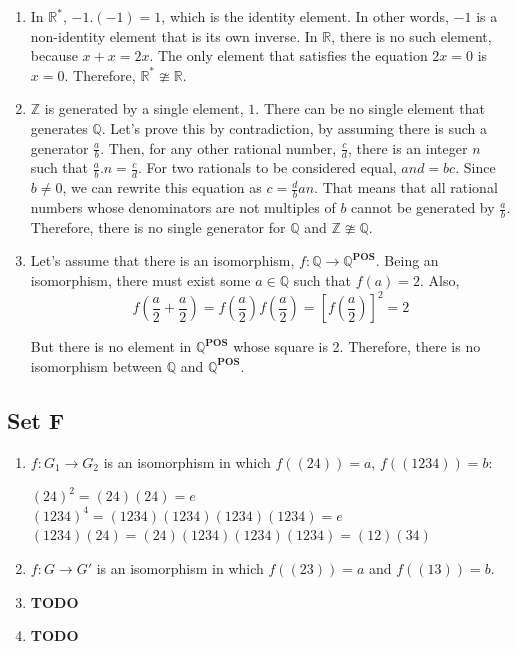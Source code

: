 \documentclass{article}
\begin{document}
\begin{enumerate}
    \item In $ \mathbb{R^*} $, $ -1.(-1) = 1 $, which is the identity element. In other words, $ -1 $ is a non-identity element that is its own inverse. In $ \mathbb{R} $, there is no such element, because $ x + x = 2x $. The only element that satisfies the equation $ 2x = 0 $ is $  x = 0 $. Therefore, $ \mathbb{R^*} \ncong \mathbb{R} $.

    \item $ \mathbb{Z} $ is generated by a single element, $ 1 $. There can be no single element that generates $ \mathbb{Q} $. Let's prove this by contradiction, by assuming there is such a generator $ \frac{a}{b} $. Then, for any other rational number, $ \frac{c}{d} $, there is an integer $ n $ such that $ \frac{a}{b}.n = \frac{c}{d} $. For two rationals to be considered equal, $ and = bc $. Since $ b \ne 0 $, we can rewrite this equation as $ c = \frac{d}{b}an $. That means that all rational numbers whose denominators are not multiples of $ b $ cannot be generated by $ \frac{a}{b} $. Therefore, there is no single generator for $ \mathbb{Q} $ and $ \mathbb{Z} \ncong \mathbb{Q} $. 

    \item Let's assume that there is an isomorphism, $ f: \mathbb{Q} \to \mathbb{Q}^{\mathbf{POS}} $. Being an isomorphism, there must exist some $ a \in \mathbb{Q} $ such that $ f(a) = 2 $. Also,
    $$
        f\left(\frac{a}{2} + \frac{a}{2}\right) = f\left(\frac{a}{2}\right)f\left(\frac{a}{2}\right) = \left[f\left(\frac{a}{2}\right)\right]^2 = 2
    $$

    But there is no element in $ \mathbb{Q}^{\mathbf{POS}} $ whose square is 2. Therefore, there is no isomorphism between $ \mathbb{Q}$ and $\mathbb{Q}^{\mathbf{POS}}$.
\end{enumerate}

\subsection{Set F}
\begin{enumerate}
    \item $ f: G_1 \to G_2 $ is an isomorphism in which $ f((24)) = a $, $ f((1234)) = b $:

    $ (24)^2 = (24)(24) = e $\\
    $ (1234)^4 = (1234)(1234)(1234)(1234) = e $\\
    $ (1234)(24) = (24)(1234)(1234)(1234) = (12)(34) $

    \item  $ f: G \to G' $ is an isomorphism in which $ f((23)) = a $ and $ f((13)) = b $.

    \item \textbf{TODO}

    \item \textbf{TODO}
\end{enumerate}
\end{document}
